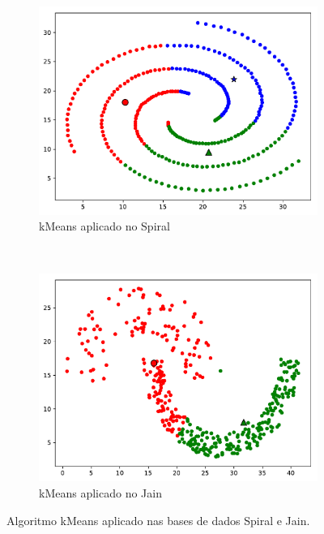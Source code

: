 \documentclass{article}
\begin{document}
\begin{figure}[h!]
	\centering
	\begin{subfigure}[t]{0.49\textwidth}
		\centering
		\includegraphics[width=\linewidth]{exercicio7-kmeans-spiral.pdf}
		\caption{kMeans aplicado no Spiral}
		\label{fig:exercicio7-kmeans-spiral}
	\end{subfigure}%
	~ 
	\begin{subfigure}[t]{0.49\textwidth}
		\centering
		\includegraphics[width=\linewidth]{exercicio7-kmeans-jain.pdf}
		\caption{kMeans aplicado no Jain}
		\label{fig:exercicio7-kmeans-jain}
	\end{subfigure}
	\caption{Algoritmo kMeans aplicado nas bases de dados Spiral e Jain.}
	\label{fig:exercicio7-kmeans}
\end{figure}
\end{document}
